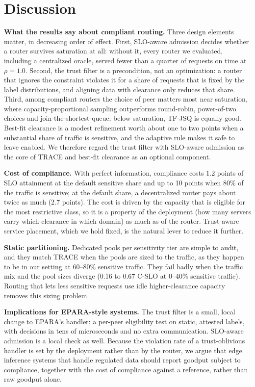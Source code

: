 \documentclass[journal]{IEEEtran}
\begin{document}
\section{Discussion}

\textbf{What the results say about compliant routing.} Three design elements matter, in decreasing order of effect. First, SLO-aware admission decides whether a router survives saturation at all: without it, every router we evaluated, including a centralized oracle, served fewer than a quarter of requests on time at \(\rho=1.0\). Second, the trust filter is a precondition, not an optimization: a router that ignores the constraint violates it for a share of requests that is fixed by the label distributions, and aligning data with clearance only reduces that share. Third, among compliant routers the choice of peer matters most near saturation, where capacity-proportional sampling outperforms round-robin, power-of-two choices and join-the-shortest-queue; below saturation, TF-JSQ is equally good. Best-fit clearance is a modest refinement worth about one to two points when a substantial share of traffic is sensitive, and the adaptive rule makes it safe to leave enabled. We therefore regard the trust filter with SLO-aware admission as the core of TRACE and best-fit clearance as an optional component.

\textbf{Cost of compliance.} With perfect information, compliance costs 1.2 points of SLO attainment at the default sensitive share and up to 10 points when 80\% of the traffic is sensitive; at the default share, a decentralized router pays about twice as much (2.7 points). The cost is driven by the capacity that is eligible for the most restrictive class, so it is a property of the deployment (how many servers carry which clearance in which domain) as much as of the router. Trust-aware service placement, which we hold fixed, is the natural lever to reduce it further.

\textbf{Static partitioning.} Dedicated pools per sensitivity tier are simple to audit, and they match TRACE when the pools are sized to the traffic, as they happen to be in our setting at 60--80\% sensitive traffic. They fail badly when the traffic mix and the pool sizes diverge (0.16 to 0.67 C-SLO at 0--40\% sensitive traffic). Routing that lets less sensitive requests use idle higher-clearance capacity removes this sizing problem.

\textbf{Implications for EPARA-style systems.} The trust filter is a small, local change to EPARA's handler: a per-peer eligibility test on static, attested labels, with decisions in tens of microseconds and no extra communication. SLO-aware admission is a local check as well. Because the violation rate of a trust-oblivious handler is set by the deployment rather than by the router, we argue that edge inference systems that handle regulated data should report goodput subject to compliance, together with the cost of compliance against a reference, rather than raw goodput alone.
\end{document}
